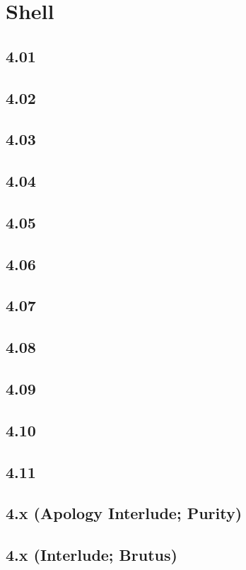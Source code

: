 \part{Shell}
 \chapter{4.01}
 \chapter{4.02}
 \chapter{4.03}
 \chapter{4.04}
 \chapter{4.05}
 \chapter{4.06}
 \chapter{4.07}
 \chapter{4.08}
 \chapter{4.09}
 \chapter{4.10}
 \chapter{4.11}
 \chapter{4.x (Apology Interlude; Purity)}
 \chapter{4.x (Interlude; Brutus)}














